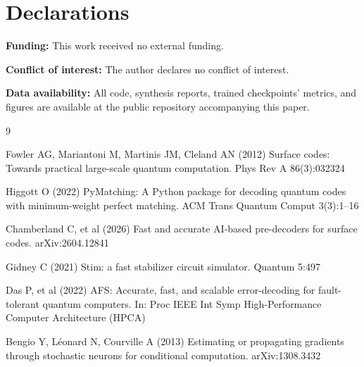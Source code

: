 \documentclass[pdflatex,sn-basic]{sn-jnl}
\begin{document}
\section*{Declarations}

\textbf{Funding:} This work received no external funding.

\textbf{Conflict of interest:} The author declares no conflict of interest.

\textbf{Data availability:} All code, synthesis reports, trained checkpoints' metrics, and figures are available at the public repository accompanying this paper.

\begin{thebibliography}{9}

Fowler AG, Mariantoni M, Martinis JM, Cleland AN (2012) Surface codes: Towards practical large-scale quantum computation. Phys Rev A 86(3):032324

Higgott O (2022) PyMatching: A Python package for decoding quantum codes with minimum-weight perfect matching. ACM Trans Quantum Comput 3(3):1--16

Chamberland C, et al (2026) Fast and accurate AI-based pre-decoders for surface codes. arXiv:2604.12841

Gidney C (2021) Stim: a fast stabilizer circuit simulator. Quantum 5:497

Das P, et al (2022) AFS: Accurate, fast, and scalable error-decoding for fault-tolerant quantum computers. In: Proc IEEE Int Symp High-Performance Computer Architecture (HPCA)

Bengio Y, L\'{e}onard N, Courville A (2013) Estimating or propagating gradients through stochastic neurons for conditional computation. arXiv:1308.3432

\end{thebibliography}
\end{document}

